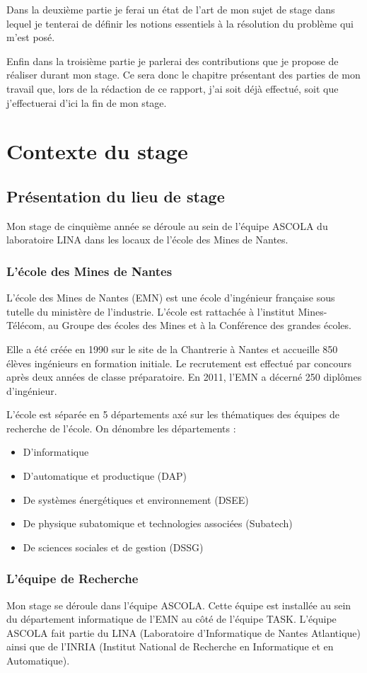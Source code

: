 \documentclass[a4paper, 11pt]{report}
\begin{document}
Dans la deuxième partie je ferai un état de l'art de mon sujet de stage dans lequel je tenterai de définir les notions essentiels à la résolution du problème qui m'est posé.

Enfin dans la troisième partie je parlerai des contributions que je propose de réaliser durant mon stage. Ce sera donc le chapitre présentant des parties de mon travail que, lors de la rédaction de ce rapport, j'ai soit déjà effectué, soit que j'effectuerai d'ici la fin de mon stage.

\chapter{Contexte du stage}
\section{Présentation du lieu de stage}
Mon stage de cinquième année se déroule au sein de l’équipe ASCOLA du laboratoire LINA dans les locaux de l’école des Mines de Nantes.
\subsection{L'école des Mines de Nantes}
L’école des Mines de Nantes (EMN) est une école d’ingénieur française sous tutelle du ministère de l’industrie. L’école est rattachée à l’institut Mines-Télécom, au Groupe des écoles des Mines et à la Conférence des grandes écoles.

Elle a été créée en 1990 sur le site de la Chantrerie à Nantes et accueille 850 élèves ingénieurs en formation initiale. Le recrutement est effectué par concours après deux années de classe préparatoire. En 2011, l’EMN a décerné 250 diplômes d’ingénieur.

L’école est séparée en 5 départements axé sur les thématiques des équipes de recherche de l'école. On dénombre les départements :
\begin{itemize}
	\item D'informatique
	\item D'automatique et productique (DAP)
	\item De systèmes énergétiques et environnement (DSEE)
	\item De physique subatomique et technologies associées (Subatech)
	\item De sciences sociales et de gestion (DSSG)
\end{itemize}

\subsection{L'équipe de Recherche}
Mon stage se déroule dans l'équipe ASCOLA. Cette équipe est installée au sein du département informatique de l’EMN au côté de l'équipe TASK. L'équipe ASCOLA fait partie du LINA (Laboratoire d'Informatique de Nantes Atlantique) ainsi que de l'INRIA (Institut National de Recherche en Informatique et en Automatique).
\end{document}

